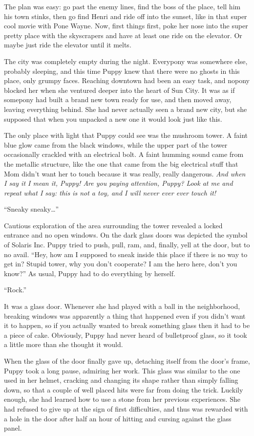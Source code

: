 The plan was easy: go past the enemy lines, find the boss of the place, tell him his town stinks, then go find Henri and ride off into the sunset, like in that super cool movie with Pone Wayne. Now, first things first, poke her nose into the super pretty place with the skyscrapers and have at least one ride on the elevator. Or maybe just ride the elevator until it melts.

The city was completely empty during the night. Everypony was somewhere else, probably sleeping, and this time Puppy knew that there were no ghosts in this place, only grumpy faces. Reaching downtown had been an easy task, and nopony blocked her when she ventured deeper into the heart of Sun City. It was as if somepony had built a brand new town ready for use, and then moved away, leaving everything behind. She had never actually seen a brand new city, but she supposed that when you unpacked a new one it would look just like this.

The only place with light that Puppy could see was the mushroom tower. A faint blue glow came from the black windows, while the upper part of the tower occasionally crackled with an electrical bolt. A faint humming sound came from the metallic structure, like the one that came from the big electrical stuff that Mom didn't want her to touch because it was really, really dangerous. \emph{And when I say it I mean it, Puppy! Are you paying attention, Puppy? Look at me and repeat what I say: this is not a toy, and I will never ever ever touch it!}

``Sneaky sneaky\dots''

Cautious exploration of the area surrounding the tower revealed a locked entrance and no open windows. On the dark glass doors was depicted the symbol of Solaris Inc. Puppy tried to push, pull, ram, and, finally, yell at the door, but to no avail. ``Hey, how am I supposed to sneak inside this place if there is no way to get in? Stupid tower, why you don't cooperate? I am the hero here, don't you know?'' As usual, Puppy had to do everything by herself.

``Rock.''

It was a glass door. Whenever she had played with a ball in the neighborhood, breaking windows was apparently a thing that happened even if you didn't want it to happen, so if you actually wanted to break something glass then it had to be a piece of cake. Obviously, Puppy had never heard of bulletproof glass, so it took a little more than she thought it would.

When the glass of the door finally gave up, detaching itself from the door's frame, Puppy took a long pause, admiring her work. This glass was similar to the one used in her helmet, cracking and changing its shape rather than simply falling down, so that a couple of well placed hits were far from doing the trick. Luckily enough, she had learned how to use a stone from her previous experiences. She had refused to give up at the sign of first difficulties, and thus was rewarded with a hole in the door after half an hour of hitting and cursing against the glass panel.

